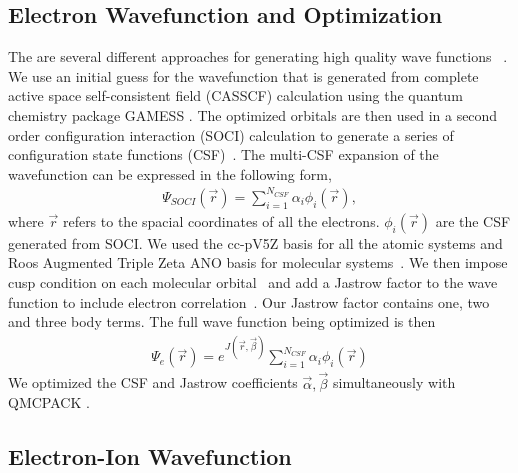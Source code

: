 \subsection{Electron Wavefunction and Optimization}
The are several different approaches for generating high quality wave functions ~\cite{Umrigar_Alleviation,Toulouse_Bench, Brown_Bench,Seth_Bench}. We use an initial guess for the wavefunction that is generated from complete active space self-consistent field (CASSCF) \cite{Chaban_MCSCF,Szabo} calculation using the quantum chemistry package GAMESS \cite{GAMESS}. The optimized orbitals are then used in a second order configuration interaction (SOCI) calculation to generate a series of configuration state functions (CSF)~\cite{Clark_Bench}. The multi-CSF expansion of the wavefunction  can be expressed in the following form,
\begin{align}
\Psi_{SOCI}(\vec{r})=\sum\limits_{i=1}^{N_{CSF}}\alpha_i\phi_i(\vec{r}), \label{eq:psi_gms}
\end{align}
where $\vec{r}$ refers to the spacial coordinates of all the electrons. $\phi_i(\vec{r})$ are the CSF generated from SOCI. We used the cc-pV5Z basis for all the atomic systems and Roos Augmented Triple Zeta ANO basis for molecular systems~\cite{dunning,roos}. We then impose cusp condition on each molecular orbital~\cite{cusp} and add a Jastrow factor to the wave function to include electron correlation~\cite{Kato}. Our Jastrow factor contains one, two and three body terms. The full wave function being optimized is then
\begin{align}
\Psi_e(\vec{r})=e^{J(\vec{r},\vec{\beta})}\sum\limits_{i=1}^{N_{CSF}}\alpha_i\phi_i(\vec{r})\label{eq:psie}
\end{align}
We optimized the CSF and Jastrow coefficients $\vec{\alpha},\vec{\beta}$ simultaneously with QMCPACK \cite{QMCPACK}.

\subsection{Electron-Ion Wavefunction}

